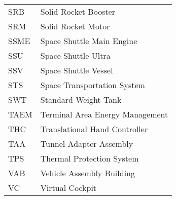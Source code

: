 \documentclass[Space_Shuttle_Vessel_Manual.tex]{subfiles}
\begin{document}
\begin{longtable}{l l }
SRB & Solid Rocket Booster\\
SRM & Solid Rocket Motor\\
SSME & Space Shuttle Main Engine\\
SSU & Space Shuttle Ultra\\
SSV & Space Shuttle Vessel\\
STS & Space Transportation System\\
SWT & Standard Weight Tank\\
TAEM & Terminal Area Energy Management\\
THC & Translational Hand Controller\\
TAA & Tunnel Adapter Assembly\\
TPS & Thermal Protection System\\
VAB & Vehicle Assembly Building\\
VC & Virtual Cockpit\\
\end{longtable}
\end{document}
